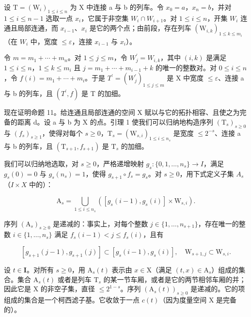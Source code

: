 设 \(\mathrm{T}=(\mathrm{W}_{i})_{1\leqslant i\leqslant n}\) 为 X 中连接 a 与 b 的列车。令 \(x_{0}=a\)，\(x_{n}=b\)，并对 \(1\leqslant i\leqslant n-1\) 选取一点 \(x_{i}\)，它属于非空集 \(W_{i}\cap W_{i+1}\)。对 \(1\leqslant i\leqslant n\)，开集 \(W_{i}\) 连通且局部连通，而 \(x_{i-1}\)、\(x_{i}\) 是它的两个点；由前段，存在列车 \((\mathrm{W}_{i,k})_{1\leqslant k\leqslant m_{i}}\)（在 \(W_{i}\) 中，宽度 \(\leqslant\varepsilon\)，连接 \(x_{i-1}\) 与 \(x_{i}\)）。

令 \(m = m_{1} + \cdots + m_{n}\)。对 \(1 \leqslant j \leqslant m\)，令 \(W_{j}^{\prime} = W_{i,k}\)，其中 \((i, k)\) 是满足 \(1 \leqslant i \leqslant n\)，\(1 \leqslant k \leqslant m_{i}\) 且 \(j = m_{1} + \cdots + m_{i-1} + k\) 的唯一的整数对。对 \(0 \leqslant i \leqslant n\)，令 \(f(i) = m_{1} + \cdots + m_{i}\)。于是 \(T^{\prime} = (W_{j}^{\prime})_{1 \leqslant j \leqslant m}\) 是 X 中宽度 \(\leqslant \varepsilon\)、连接 a 与 b 的列车，且 \((T^{\prime}, f)\) 是 T 的加细。

现在证明命题 11。给连通且局部连通的空间 X 赋以与它的拓扑相容、且使之为完备的距离 d。设 a 与 b 为 X 的点。引理 1 使我们可以归纳地构造序列 \((\mathrm{T}_s)_{s \geqslant 0}\) 与 \((f_s)_{s \geqslant 1}\)，使得对每个 \(s \geqslant 0\)，\(\mathrm{T}_s = (\mathrm{W}_{s,i})_{1 \leqslant i \leqslant n_s}\) 是宽度 \(\leqslant 2^{-s}\)、连接 a 与 b 的列车，且 \((\mathrm{T}_{s+1}, f_{s+1})\) 是 \(\mathrm{T}_s\) 的加细。

我们可以归纳地选取，对 \(s \geqslant 0\)，严格递增映射 \(g_{s} \colon \{0,1,\ldots,n_{s}\} \to I\)，满足 \(g_{s}(0) = 0\) 与 \(g_{s}(n_{s}) = 1\)，使得 \(g_{s+1} \circ f_{s} = g_{s}\)。对 \(s \geqslant 0\)，用下式定义子集 \(A_{s}\)（\(I \times X\) 中的）：

\[
\mathrm{A} _ {s} = \bigcup_ {1 \leqslant i \leqslant n _ {s}} ([ g _ {s} (i - 1), g _ {s} (i) ] \times \mathrm{W} _ {s, i}).
\]

序列 \((\mathrm{A}_{s})_{s\geqslant0}\) 是递减的：事实上，对每个整数 \(j\in\{1,\ldots,n_{s+1}\}\)，存在唯一的整数 \(i\in\{1,\ldots,n_{s}\}\) 满足 \(f_{s}(i-1)<j\leqslant f_{s}(i)\)，且有

\[
[ g _ {s + 1} (j - 1), g _ {s + 1} (j) ] \subset [ g _ {s} (i - 1), g _ {s} (i) ], \quad \mathrm{W} _ {s + 1, j} \subset \mathrm{W} _ {s, i}.
\]

设 \(t \in \mathbf{I}\)。对所有 \(s \geqslant 0\)，用 \(\mathrm{A}_s(t)\) 表示由 \(x \in \mathrm{X}\)（满足 \((t, x) \in \mathrm{A}_s\)）组成的集合。集合 \(\mathrm{A}_s(t)\) 或者是列车 \(\mathrm{T}_s\) 的某一节车厢，或者是它的两节相邻车厢的并；因此它是 \(\mathrm{X}\) 的非空子集，直径 \(\leqslant 2^{1-s}\)。序列 \((\mathrm{A}_s(t))_{s \geqslant 0}\) 是递减的。它的项组成的集合是一个柯西滤子基。它收敛于一点 \(c(t)\)（因为度量空间 \(\mathrm{X}\) 是完备的）。

